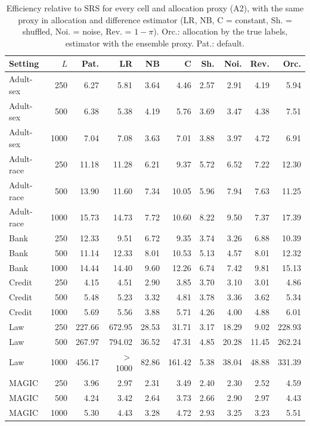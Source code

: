 \documentclass[pdflatex,sn-mathphys-num,iicol]{sn-jnl}
\theoremstyle{thmstyleone}
\theoremstyle{thmstyletwo}
\theoremstyle{thmstylethree}
\begin{document}
\begin{table}[t]
\centering\scriptsize
\caption{Efficiency relative to SRS for every cell and allocation proxy (A2), with the same proxy in allocation and difference estimator (LR, NB, C = constant, Sh. = shuffled, Noi. = noise, Rev. = $1-\pi$). Orc.: allocation by the true labels, estimator with the ensemble proxy. Pat.: default.}
\label{tab:abl-app-eff-proxy}
\setlength{\tabcolsep}{4pt}
\begin{tabular}{lrrrrrrrrr}
\toprule
Setting & $L$ & Pat. & LR & NB & C & Sh. & Noi. & Rev. & Orc. \\
\midrule
Adult-sex & 250 & 6.27 & 5.81 & 3.64 & 4.46 & 2.57 & 2.91 & 4.19 & 5.94 \\
Adult-sex & 500 & 6.38 & 5.38 & 4.19 & 5.76 & 3.69 & 3.47 & 4.38 & 7.51 \\
Adult-sex & 1000 & 7.04 & 7.08 & 3.63 & 7.01 & 3.88 & 3.97 & 4.72 & 6.91 \\
Adult-race & 250 & 11.18 & 11.28 & 6.21 & 9.37 & 5.72 & 6.52 & 7.22 & 12.30 \\
Adult-race & 500 & 13.90 & 11.60 & 7.34 & 10.05 & 5.96 & 7.94 & 7.63 & 11.25 \\
Adult-race & 1000 & 15.73 & 14.73 & 7.72 & 10.60 & 8.22 & 9.50 & 7.37 & 17.39 \\
Bank & 250 & 12.33 & 9.51 & 6.72 & 9.35 & 3.74 & 3.26 & 6.88 & 10.39 \\
Bank & 500 & 11.14 & 12.33 & 8.01 & 10.53 & 5.13 & 4.57 & 8.01 & 12.32 \\
Bank & 1000 & 14.44 & 14.40 & 9.60 & 12.26 & 6.74 & 7.42 & 9.81 & 15.13 \\
Credit & 250 & 4.15 & 4.51 & 2.90 & 3.85 & 3.70 & 3.10 & 3.01 & 4.86 \\
Credit & 500 & 5.48 & 5.23 & 3.32 & 4.81 & 3.78 & 3.36 & 3.62 & 5.34 \\
Credit & 1000 & 5.69 & 5.56 & 3.88 & 5.71 & 4.26 & 4.00 & 4.88 & 6.01 \\
Law & 250 & 227.66 & 672.95 & 28.53 & 31.71 & 3.17 & 18.29 & 9.02 & 228.93 \\
Law & 500 & 267.97 & 794.02 & 36.52 & 47.31 & 4.85 & 20.28 & 11.45 & 262.24 \\
Law & 1000 & 456.17 & $>$1000 & 82.86 & 161.42 & 5.38 & 38.04 & 48.88 & 331.39 \\
MAGIC & 250 & 3.96 & 2.97 & 2.31 & 3.49 & 2.40 & 2.30 & 2.52 & 4.59 \\
MAGIC & 500 & 4.24 & 3.42 & 2.64 & 3.73 & 2.66 & 2.90 & 2.97 & 4.43 \\
MAGIC & 1000 & 5.30 & 4.43 & 3.28 & 4.72 & 2.93 & 3.25 & 3.23 & 5.51 \\

\end{tabular}
\end{table}
\end{document}
